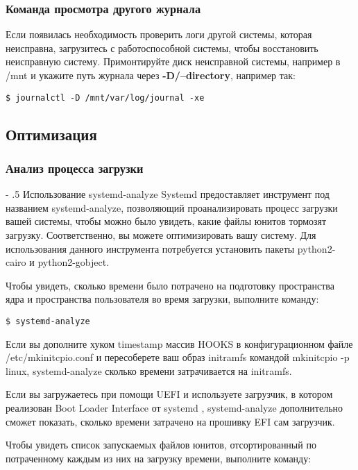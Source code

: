 \documentclass[a4paper,10pt,twoside]{article}
\makeatletter
\renewcommand\paragraph{%
   \@startsection{paragraph}{4}{0mm}%
      {-\baselineskip}%
      {.5\baselineskip}%
      {\normalfont\normalsize\bfseries}}
\makeatother
\begin{document}
\subsubsection{Команда просмотра другого журнала}
Если появилась необходимость проверить логи другой системы, которая неисправна, загрузитесь с работоспособной системы, чтобы восстановить неисправную систему. Примонтируйте диск неисправной системы, например в /mnt и укажите путь журнала через \textbf{-D/--directory}, например так:

\begin{verbatim}
$ journalctl -D /mnt/var/log/journal -xe
\end{verbatim} 

\subsection{Оптимизация}
\subsubsection{Анализ процесса загрузки}
\paragraph{Использование systemd-analyze}
Systemd предоставляет инструмент под названием systemd-analyze, позволяющий проанализировать процесс загрузки вашей системы, чтобы можно было увидеть, какие файлы юнитов тормозят загрузку. Соответственно, вы можете оптимизировать вашу систему. Для использования данного инструмента потребуется установить пакеты python2-cairo и python2-gobject.

Чтобы увидеть, сколько времени было потрачено на подготовку пространства ядра и пространства пользователя во время загрузки, выполните команду:

\begin{verbatim}
$ systemd-analyze
\end{verbatim} 

Если вы дополните хуком timestamp массив HOOKS в конфигурационном файле /etc/mkinitcpio.conf и пересоберете ваш образ initramfs командой mkinitcpio -p linux, systemd-analyze сколько времени затрачивается на initramfs.

Если вы загружаетесь при помощи UEFI и используете загрузчик, в котором реализован Boot Loader Interface от systemd , systemd-analyze дополнительно сможет показать, сколько времени затрачено на прошивку EFI сам загрузчик.

Чтобы увидеть список запускаемых файлов юнитов, отсортированный по потраченному каждым из них на загрузку времени, выполните команду:
\end{document}
